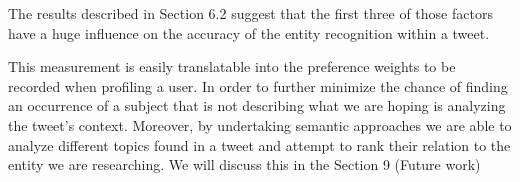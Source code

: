The results described in Section 6.2 suggest that the first three of those factors have a huge influence on the accuracy of the entity recognition within a tweet.

This measurement is easily translatable into the preference weights to be recorded when profiling a user.
In order to further minimize the chance of finding an occurrence of a subject that is not describing what we are hoping is analyzing the tweet's context.
Moreover, by undertaking semantic approaches we are able to analyze different topics found in a tweet and attempt to rank their relation to the entity we are researching. We will discuss this in the Section 9 (Future work)

